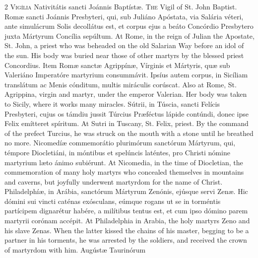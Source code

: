 \begin{paracol}{2}
\lettrine[lines=1]{V}{igília} Nativitátis 
 sancti Joánnis Baptístæ.
\switchcolumn
{}
\lettrine[lines=1]{T}{he} Vigil of St. John Baptist.
\switchcolumn*
{}
Romæ sancti Joánnis 
 Presbyteri, qui, sub Juliáno Apóstata, via Salária véteri, ante simulácrum 
 Solis decollátus est, et corpus ejus a beáto Concórdio Presbytero juxta 
 Mártyrum Concília sepúltum.
\switchcolumn
{}
At Rome, in the reign of Julian the 
 Apostate, St. John, a priest who was beheaded on the old Salarian Way before 
 an idol of the sun. His body was buried near those of other martyrs by 
 the blessed priest Concordius.
\switchcolumn*
{}
Item Romæ sanctæ 
 Agrippínæ, Vírginis et Mártyris, quæ sub Valeriáno Imperatóre martyrium 
 consummávit. Ipsíus autem corpus, in Sicíliam translátum ac Menis 
 cónditum, multis miráculis corúscat.
\switchcolumn
{}
Also at Rome, St. Agrippina, virgin 
 and martyr, under the emperor Valerian. Her body was taken to Sicily, 
 where it works many miracles.
\switchcolumn*
{}
Sútrii, in Túscia, 
 sancti Felícis Presbyteri, cujus os támdiu jussit Túrcius Præféctus lápide 
 contúndi, donec ipse Felix emítteret spíritum.
\switchcolumn
{}
At Sutri in Tuscany, St. Felix, 
 priest. By the command of the prefect Turcius, he was struck on the 
 mouth with a stone until he breathed no more.
\switchcolumn*
{}
Nicomedíæ commemorátio 
 plurimórum sanctórum Mártyrum, qui, témpore Diocletiáni, in móntibus et 
 spelúncis laténtes, pro Christi nómine martyrium læto ánimo subiérunt.
\switchcolumn
{}
At Nicomedia, in the time of 
 Diocletian, the commemoration of many holy martyrs who concealed themselves 
 in mountains and caverns, but joyfully underwent martyrdom for the name of 
 Christ.
\switchcolumn*
{}
Philadelphíæ, in 
 Arábia, sanctórum Mártyrum Zenónis, ejúsque servi Zenæ. Hic dómini sui 
 vincti caténas exósculans, eúmque rogans ut se in torméntis partícipem 
 dignarétur habére, a milítibus tentus est, et cum ipso dómino parem martyrii 
 corónam accépit.
\switchcolumn
{}
At Philadelphia in Arabia, the holy 
 martyrs Zeno and his slave Zenas. When the latter kissed the chains of 
 his master, begging to be a partner in his torments, he was arrested by the 
 soldiers, and received the crown of martyrdom with him.
\switchcolumn*
{}
Augústæ Taurinórum 

\end{paracol}
